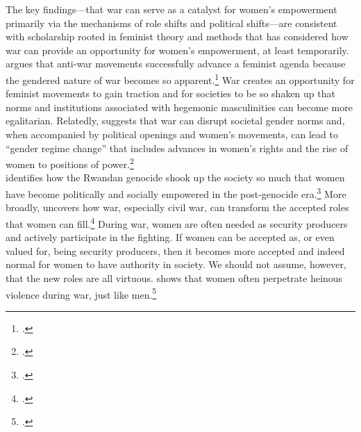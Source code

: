 \documentclass [12pt] {article}
\begin{document}
The key findings---that war can serve as a catalyst for women's empowerment primarily via the mechanisms of role shifts and political shifts---are consistent with scholarship rooted in feminist theory and methods that has considered how war can provide an opportunity for women's empowerment, at least temporarily. \citeauthor{cockburn2010gender} argues that anti-war movements successfully advance a feminist agenda because the gendered nature of war becomes so apparent.\footnote{.} War creates an opportunity for feminist movements to gain traction and for societies to be so shaken up that norms and institutions associated with hegemonic masculinities can become more egalitarian. Relatedly, \citeauthor{tripp2015women} suggests that war can disrupt societal gender norms and, when accompanied by political openings and women's movements, can lead to ``gender regime change'' that includes advances in women's rights and the rise of women to positions of power.\footnote{.}\\

\citeauthor{mageza2015mobilizing} identifies how the Rwandan genocide shook up the society so much that women have become politically and socially empowered in the post-genocide era.\footnote{.}
More broadly, \citeauthor{wood2008social} uncovers how war, especially civil war, can transform the accepted roles that women can fill.\footnote{.} During war, women are often needed as security producers and actively participate in the fighting. If women can be accepted as, or even valued for, being security producers, then it becomes more accepted and indeed normal for women to have authority in society. We should not assume, however, that the new roles are all virtuous. \citeauthor{sjoberg2016women} shows that women often perpetrate heinous violence during war, just like men.\footnote{.} \\
\end{document}
